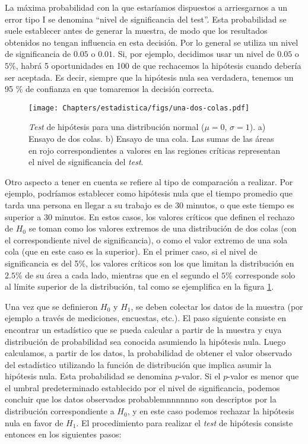 La máxima probabilidad con la que estaríamos dispuestos a arriesgarnos a un error tipo I se denomina ``nivel de significancia del test''. Esta probabilidad se suele establecer antes de generar la muestra, de modo que los resultados obtenidos no tengan influencia en esta decisión. Por lo general se utiliza un nivel de significancia de $0.05$ o $0.01$. Si, por ejemplo, decidimos usar un nivel de $0.05$ o $5\%$, habrá 5 oportunidades en 100 de que rechacemos la hipótesis cuando debería ser aceptada. Es decir, siempre que la hipótesis nula sea verdadera, tenemos un 95 \% de confianza en que tomaremos la decisión correcta.

\begin{figure}[t]
 \centering
 \texttt{[image: Chapters/estadistica/figs/una-dos-colas.pdf]}
 \caption{\textit{Test} de hipótesis para una distribución normal ($\mu = 0$, $\sigma = 1$). a) Ensayo de dos colas. b) Ensayo de una cola. Las sumas de las áreas en rojo correspondientes a valores en las regiones críticas representan el nivel de significancia del \textit{test}.}
 \label{fig:estad01b}
\end{figure}

Otro aspecto a tener en cuenta se refiere al tipo de comparación a realizar. Por ejemplo, podríamos establecer como hipótesis nula que el tiempo promedio que tarda una persona en llegar a su trabajo es de 30 minutos, o que este tiempo es superior a 30 minutos. En estos casos, los valores críticos que definen el rechazo de $H_0$ se toman como los valores extremos de una distribución de dos colas (con el correspondiente nivel de significancia), o como el valor extremo de una sola cola (que en este caso es la superior). En el primer caso, si el nivel de significancia es del 5\%, los valores críticos son los que limitan la distribución en $2.5$\% de su área a cada lado, mientras que en el segundo el $5$\% corresponde solo al límite superior de la distribución, tal como se ejemplifica en la figura \ref{fig:estad01b}.

Una vez que se definieron $H_0$ y $H_1$, se deben colectar los datos de la muestra (por ejemplo a través de mediciones, encuestas, etc.). El paso siguiente consiste en encontrar un estadístico que se pueda calcular a partir de la muestra y cuya distribución de probabilidad sea conocida asumiendo la hipótesis nula. Luego calculamos, a partir de los datos, la probabilidad de obtener el valor observado del estadístico utilizando la función de distribución que implica asumir la hipótesis nula. Esta probabilidad se denomina $p$-valor. Si el $p$-valor es menor que el umbral predeterminado establecido por el nivel de significancia, podemos concluir que los datos observados probablemnnnnnno son descriptos por la distribución correspondiente a $H_0$, y en este caso podemos rechazar la hipótesis nula en favor de $H_1$. El procedimiento para realizar el \textit{test} de hipótesis consiste entonces en los siguientes pasos:


